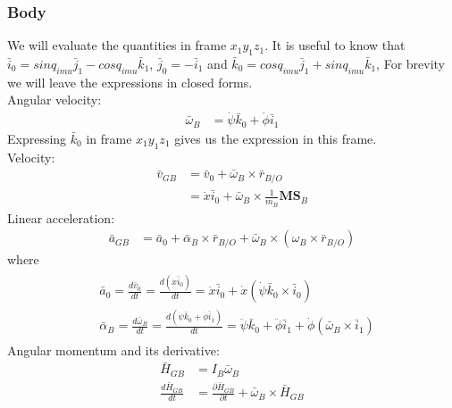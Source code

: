 \documentclass[a4paper,10pt]{article}
\begin{document}
\subsubsection{Body}
We will evaluate the quantities in frame $x_1y_1z_1$. It is useful to know that $\bar{i}_0=sinq_{imu}\bar{j}_1-cosq_{imu}\bar{k}_1$,
$\bar{j}_0=-\bar{i}_1$ and $\bar{k}_0=cosq_{imu}\bar{j}_1+sinq_{imu}\bar{k}_1$,
For brevity we will leave the expressions in closed forms.\\
Angular velocity:
\begin{align}
 \bar{\omega}_B &= \dot\psi\bar{k}_0 + \dot\phi\bar{i}_1 
\end{align}
Expressing $\bar{k}_0$ in frame $x_1y_1z_1$ gives us the expression in this frame.
\\Velocity:
\begin{align}
  \bar{v}_{GB} &= \bar{v}_0 + \bar{\omega}_B \times \bar{r}_{B/O} \nonumber \\
  &= \dot{x}\bar{i}_0 + \bar{\omega}_B \times \frac{1}{m_B}\mathbf{MS}_{B} 
\end{align}
Linear acceleration:
\begin{align}
 \bar{a}_{GB} &= \bar{a}_0 + \bar\alpha_B \times \bar{r}_{B/O} + \bar\omega_B \times \left( \omega_B \times \bar{r}_{B/O}\right) 
\end{align}
where 
\begin{align} \begin{split}
 &\bar{a}_0 = \frac{d\bar{v}_0}{dt} = \frac{d\left(\dot{x}\bar{i}_0\right)}{dt} 
 = \ddot{x}\bar{i}_0+\dot{x}\left(\dot\psi\bar{k}_0 \times \bar{i}_0\right)  \\
 &\bar\alpha_B = \frac{d\bar{\omega}_B}{dt} = \frac{d\left(\dot\psi\bar{k}_0 + \dot\phi\bar{i}_1 \right)}{dt}
 = \ddot\psi\bar{k}_0 + \ddot\phi\bar{i}_1 + \dot\phi\left(\bar\omega_B \times \bar{i}_1\right) \label{a0alphaB}
\end{split} \end{align}
Angular momentum and its derivative:
\begin{align}
 \bar{H}_{GB} &= I_B\bar{\omega}_B \nonumber \\
 \frac{d\bar{H}_{GB}}{dt} &= \frac{\partial \bar{H}_{GB}}{\partial t} + \bar\omega_B \times \bar{H}_{GB} \label{kanesLHSVariableEnd}
\end{align}
\end{document}

